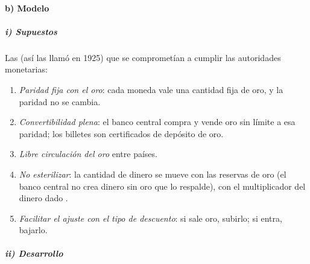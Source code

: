 \documentclass[11pt]{article}
\begin{document}
\paragraph{b) Modelo}

\subparagraph{i) Supuestos}

Las  (así las llamó  en 1925) que se comprometían a cumplir las autoridades monetarias:

\begin{enumerate}
\item \emph{Paridad fija con el oro}: cada moneda vale una cantidad fija de oro, y la paridad no se cambia.
\item \emph{Convertibilidad plena}: el banco central compra y vende oro sin límite a esa paridad; los billetes son certificados de depósito de oro.
\item \emph{Libre circulación del oro} entre países.
\item \emph{No esterilizar}: la cantidad de dinero se mueve con las reservas de oro (el banco central no crea dinero sin oro que lo respalde), con el multiplicador del dinero dado .
\item \emph{Facilitar el ajuste con el tipo de descuento}: si sale oro, subirlo; si entra, bajarlo.
\end{enumerate}

\subparagraph{ii) Desarrollo}
\end{document}
